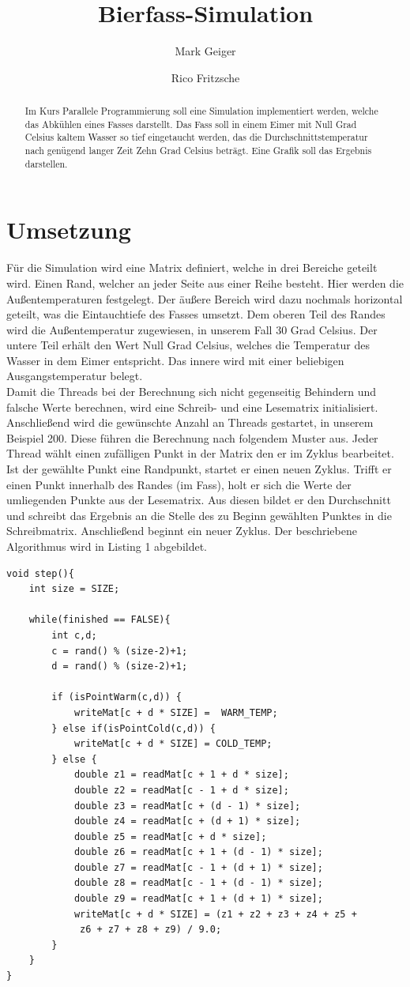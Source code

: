 \documentclass[]{article}
\title{Bierfass-Simulation}
\author{Mark Geiger \and Rico Fritzsche}
\begin{document}
\maketitle

\begin{abstract}
Im Kurs Parallele Programmierung soll eine Simulation implementiert werden, welche das Abkühlen eines Fasses darstellt. Das Fass soll in einem Eimer mit Null Grad Celsius kaltem Wasser so tief eingetaucht werden, das die Durchschnittstemperatur nach genügend langer Zeit Zehn Grad Celsius beträgt. Eine Grafik soll das Ergebnis darstellen. 
\end{abstract}

\section*{Umsetzung}
Für die Simulation wird eine Matrix definiert, welche in drei Bereiche geteilt wird. Einen Rand, welcher an jeder Seite aus einer Reihe besteht. Hier werden die Außentemperaturen festgelegt. Der äußere Bereich wird dazu nochmals horizontal geteilt, was die Eintauchtiefe des Fasses umsetzt. Dem oberen Teil des Randes wird die Außentemperatur zugewiesen, in unserem Fall 30 Grad Celsius. Der untere Teil erhält den Wert Null Grad Celsius, welches die Temperatur des Wasser in dem Eimer entspricht. Das innere wird mit einer beliebigen Ausgangstemperatur belegt. \\
Damit die Threads bei der Berechnung sich nicht gegenseitig Behindern und falsche Werte berechnen, wird eine Schreib- und eine Lesematrix initialisiert. Anschließend wird die gewünschte Anzahl an Threads gestartet, in unserem Beispiel 200. Diese führen die Berechnung nach folgendem Muster aus. Jeder Thread wählt einen zufälligen Punkt in der Matrix den er im Zyklus bearbeitet. Ist der gewählte Punkt eine Randpunkt, startet er einen neuen Zyklus. Trifft er einen Punkt innerhalb des Randes (im Fass), holt er sich die Werte der umliegenden Punkte aus der Lesematrix. Aus diesen bildet er den Durchschnitt und schreibt das Ergebnis an die Stelle des zu Beginn gewählten Punktes in die Schreibmatrix. Anschließend beginnt ein neuer Zyklus. Der beschriebene Algorithmus wird in Listing 1 abgebildet.

\begin{lstlisting}
void step(){   
	int size = SIZE;
	
	while(finished == FALSE){
		int c,d;
		c = rand() % (size-2)+1;
		d = rand() % (size-2)+1;
		
		if (isPointWarm(c,d)) {
			writeMat[c + d * SIZE] =  WARM_TEMP;
		} else if(isPointCold(c,d)) {
			writeMat[c + d * SIZE] = COLD_TEMP;
		} else {
			double z1 = readMat[c + 1 + d * size];
			double z2 = readMat[c - 1 + d * size];
			double z3 = readMat[c + (d - 1) * size];
			double z4 = readMat[c + (d + 1) * size];
			double z5 = readMat[c + d * size];
			double z6 = readMat[c + 1 + (d - 1) * size];
			double z7 = readMat[c - 1 + (d + 1) * size];
			double z8 = readMat[c - 1 + (d - 1) * size];
			double z9 = readMat[c + 1 + (d + 1) * size];
			writeMat[c + d * SIZE] = (z1 + z2 + z3 + z4 + z5 +
			 z6 + z7 + z8 + z9) / 9.0;
		}
	}
}
\end{lstlisting}
\end{document}
